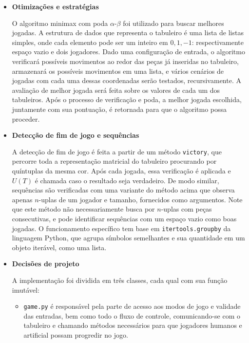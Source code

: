 \documentclass{article}
\begin{document}
\begin{itemize}
    \item \textbf{Otimizações e estratégias}

        O algoritmo minimax com poda $\alpha$-$\beta$ foi utilizado para
        buscar melhores jogadas. A estrutura de dados que representa o
        tabuleiro é uma lista de listas simples, onde cada elemento pode
        ser um inteiro em $0, 1, -1$: respectivamente espaço vazio e dois
        jogadores. Dado uma configuração de entrada, o algoritmo verificará
        possíveis movimentos ao redor das peças já inseridas no tabuleiro,
        armazenará os possíveis movimentos em uma lista, e vários cenários
        de jogadas com cada uma dessas coordenadas serão testados,
        recursivamente. A avaliação de melhor jogada será feita sobre os
        valores de cada um dos tabuleiros. Após o processo de verificação
        e poda, a melhor jogada escolhida, juntamente com sua pontuação,
        é retornada para que o algoritmo possa proceder.

    \item \textbf{Detecção de fim de jogo e sequências}

        A detecção de fim de jogo é feita a partir de um método
        \texttt{victory}, que percorre toda a representação matricial do
        tabuleiro procurando por quíntuplas da mesma cor. Após cada jogada,
        essa verificação é aplicada e $U(T)$ é chamada caso o resultado
        seja verdadeiro. De modo similar, sequências são verificadas com
        uma variante do método acima que observa apenas $n$-uplas de um
        jogador e tamanho, fornecidos como argumentos. Note que este método
        não necessariamente busca por $n$-uplas com peças consecutivas, e
        pode identificar sequências com um espaço vazio como boas jogadas. O
        funcionamento específico tem base em \texttt{itertools.groupby} da
        linguagem Python, que agrupa símbolos semelhantes e sua quantidade em
        um objeto iterável, como uma lista.

    \item \textbf{Decisões de projeto}

        A implementação foi dividida em três classes, cada qual com sua
        função imutável:

        \begin{itemize}

            \item \texttt{game.py} é responsável pela parte de acesso aos
                modos de jogo e validade das entradas, bem como todo o fluxo
                de controle, comunicando-se com o tabuleiro e chamando métodos
                necessários para que jogadores humanos e artificial possam
                progredir no jogo.


\end{itemize}
\end{itemize}
\end{document}
